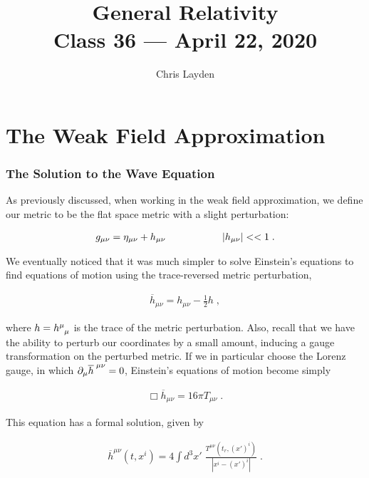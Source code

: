 \documentclass[10pt]{article}
\title{{\Huge General Relativity}\\{\Large{Class 36 --- April 22, 2020}}} %
\author{Chris Layden}
\begin{document}
    \maketitle
    \flushbottom
    \newpage
    \pagestyle{fancynotes}
    \part{The Weak Field Approximation}
	
\section{The Solution to the Wave Equation}
As previously discussed, when working in the weak field approximation, we define our metric to be the flat space metric with a slight perturbation:
              	
\begin{align}\label{eq:weak_metric}
g_{\mu\nu} = \eta_{\mu\nu} + h_{\mu\nu} \hspace{2 cm} |h_{\mu\nu}| << 1 \;.
\end{align}
              	
We eventually noticed that it was much simpler to solve Einstein's equations to find equations of motion using the trace-reversed metric perturbation,
              	
\begin{align}\label{eq:trace_reversed}
\overline{h}_{\mu\nu} = h_{\mu\nu} - \frac{1}{2} h\;,
\end{align}
              	
\noindent where $h = \tensor{h}{^\mu_\mu}$ is the trace of the metric perturbation. Also, recall that we have the ability to perturb our coordinates by a small amount, inducing a gauge transformation on the perturbed metric. If we in particular choose the Lorenz gauge, in which $\partial_\mu \tensor{\overline{h}}{^\;^\mu^\nu} = 0$, Einstein's equations of motion become simply
              	
\begin{align}\label{eq:wave_eqn}
\Box \overline{h}_{\mu\nu} = 16 \pi T_{\mu\nu}\;.
\end{align}
              	
This equation has a formal solution, given by
              	
\begin{align}\label{eq:FormalSln}
\overline{h}^{\mu\nu}(t,x^i) =  4\int d^3 x' \; \frac{T^{\mu\nu}(t_r,(x')^i)}{|x^i-(x')^i|} \;.
\end{align}
              	
\end{document}

